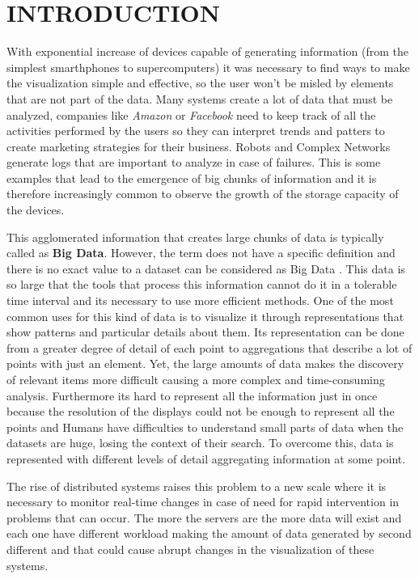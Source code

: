 \documentclass[letterpaper, 10 pt, conference]{ieeeconf}  %
\begin{document}
\section{INTRODUCTION}


With exponential increase of devices capable of generating information (from the simplest smarthphones to supercomputers) it was necessary to find ways to make the visualization simple and effective, so the user won't be misled by elements that are not part of the data. Many systems create a lot of data that must be analyzed, companies like \textit{Amazon} or \textit{Facebook} need to keep track of all the activities performed by the users so they can interpret trends and patters to create marketing strategies for their business. Robots and Complex Networks generate logs that are important to analyze in case of failures. This is some examples that lead to the emergence of big chunks of information and it is therefore increasingly common to observe the growth of the storage capacity of the devices.

This agglomerated information that creates large chunks of data is typically called as \textbf{Big Data}. However, the term does not have a specific definition and there is no exact value to a dataset can be considered as Big Data \cite{WardB13a}. This data is so large that the tools that process this information cannot do it in a tolerable time interval and its necessary to use more efficient methods. One of the most common uses for this kind of data is to visualize it through representations that show patterns and particular details about them. Its representation can be done from a greater degree of detail of each point to aggregations that describe a lot of points with just an element. Yet, the large amounts of data makes the discovery of relevant items more difficult causing a more complex and time-consuming analysis. Furthermore its hard to represent all the information just in once because the resolution of the displays could not be enough to represent all the points and Humans have difficulties to understand small parts of data when the datasets are huge, losing the context of their search. To overcome this, data is represented with different levels of detail aggregating information at some point. 

The rise of distributed systems raises this problem to a new scale where it is necessary to monitor real-time changes in case of need for rapid intervention in problems that can occur. The more the servers are the more data will exist and each one have different workload making the amount of data generated by second different and that could cause abrupt changes in the visualization of these systems.
\end{document}
